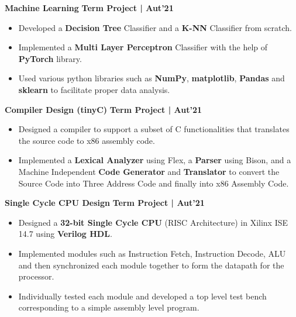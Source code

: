 \documentclass[10pt]{article}
\begin{document}
\spacedhrule{0.15ex}{1.0ex}
\large {\textbf{Machine Learning}} \normalsize  \href{https://github.com/Abhitipu/ML} {\hspace{0.5ex}\faGithub} {\hfill} \textbf{Term Project | Aut'21}\\[-1.75em]
\begin{itemize}
    \item Developed a \textbf{Decision Tree} Classifier and a \textbf{K-NN} Classifier from scratch.\\[-2em]
    \item Implemented a \textbf{Multi Layer Perceptron} Classifier with the help of \textbf{PyTorch} library.\\[-2em]
    \item Used various python libraries such as \textbf{NumPy}, \textbf{matplotlib}, \textbf{Pandas} and \textbf{sklearn} to facilitate proper data analysis.
    \\[-0.75em]
\end{itemize}
\vspace{-0.5ex}
\large {\textbf{Compiler Design (tinyC)}} \normalsize \href{https://github.com/Abhitipu/Compilers}{\faGithub} {\hfill} \textbf{Term Project | Aut'21}\\[-1.8em]
\begin{itemize}
    \item Designed a compiler to support a subset of C functionalities that translates the source code to x86 assembly code.\\[-2em]
    \item Implemented a \textbf{Lexical Analyzer} using Flex, a \textbf{Parser} using Bison, and a Machine Independent \textbf{Code Generator} and \textbf{Translator} to convert the Source Code into Three Address Code and finally into x86 Assembly Code.\\[-1em]
\end{itemize}
\large {\textbf{Single Cycle CPU Design}} \normalsize \href{https://github.com/Abhitipu/COA/tree/main/Assn7}{\faGithub} {\hfill} \textbf{Term Project | Aut'21}\\[-1.8em]
\begin{itemize}
    \item Designed a \textbf{32-bit Single Cycle CPU} (RISC Architecture) in Xilinx ISE 14.7 using \textbf{Verilog HDL}.\\[-2em]
    \item Implemented modules such as Instruction Fetch, Instruction Decode, ALU and then synchronized each module together to form the datapath for the processor.\\[-2em]
    \item Individually tested each module and developed a top level test bench corresponding to a simple assembly level program.\\[-1em] 
\end{itemize}
\end{document}
